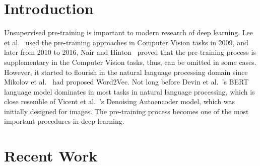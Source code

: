 \documentclass[runningheads]{llncs}
\begin{document}
\section{Introduction}

  Unsupervised pre-training is important to modern research of deep learning.
  Lee et al.~\cite{lee2009convolutional} used the pre-training approaches
  in Computer Vision tasks in 2009, and later from 2010 to 2016,
  Nair and Hinton~\cite{nair2010rectified} proved that the pre-training process is supplementary in the Computer Vision tasks,
  thus, can be omitted in some cases.
  However, it started to flourish in the natural language processing domain since Mikolov et al.~\cite{mikolov2013distributed} had proposed Word2Vec.
  Not long before Devin et al.~\cite{devlin2019bert}'s BERT language model dominates in most tasks in natural language processing,
  which is close resemble of Vicent et al.~\cite{vincent2008extracting}'s Denoising Autoencoder model, which was initially designed for images.
  The pre-training process becomes one of the most important procedures in deep learning.


\section{Recent Work}
\end{document}
